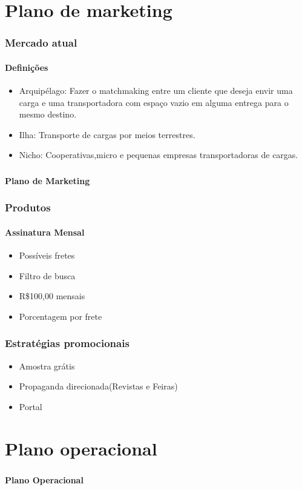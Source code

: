 \documentclass{beamer}
\begin{document}
\section{Plano de marketing}

\begin{frame}
  \frametitle{Mercado atual}

  \framesubtitle{Definições}
      \begin{itemize}
      \item Arquipélago:  Fazer o matchmaking entre um cliente que deseja envir uma carga e uma transportadora com espaço vazio em alguma entrega para o mesmo destino.
      \item Ilha: Transporte de cargas por meios terrestres.
      \item Nicho: Cooperativas,micro e pequenas empresas transportadoras de cargas.
      \end{itemize}
\end{frame}

\begin{frame}
  \frametitle{}
  \framesubtitle{}

  \begin{center}
    {\huge\textbf{Plano de Marketing}}
  \end{center}
\end{frame}

\begin{frame}
  \frametitle{Produtos}
  \framesubtitle{Assinatura Mensal}
	\begin{itemize}
	\item Possíveis fretes
	\item Filtro de busca
	\item R\$100,00 mensais
	\item Porcentagem por frete
	\end{itemize}

\end{frame}

\begin{frame}
  \frametitle{Estratégias promocionais}
  	\begin{itemize}
	\item Amostra grátis
	\item Propaganda direcionada(Revistas e Feiras)
	\item Portal
	\end{itemize}

\end{frame}

\section{Plano operacional}
\begin{frame}
  \frametitle{}
  \framesubtitle{}

  \begin{center}
    {\huge\textbf{Plano Operacional}}
  \end{center}
\end{frame}
\end{document}

